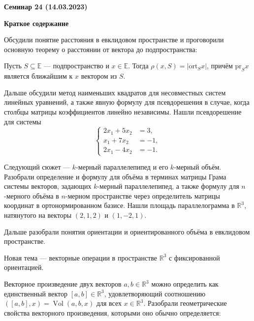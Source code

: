 \documentclass[10pt, a4paper]{extarticle}
\def \R{\mathbb{R}}
\newcommand{\Vol}{\mathop{\mathrm{Vol}}}
\theoremstyle{definition}
\begin{document}
\begin{center}
\small
\noindent{}
\end{center}

\large

\begin{center}
\textbf{Семинар 24 (14.03.2023)}
\end{center}

\textbf{Краткое содержание}

Обсудили понятие расстояния в евклидовом пространстве и проговорили основную теорему о расстоянии от вектора до подпространства:

Пусть $S \subseteq \mathbb E$ --- подпространство и $x \in \mathbb E$.
Тогда $\rho(x,S) = | \mathrm{ort}_S x |$, причём $\mathrm{pr}_S x$ является ближайшим к $x$ вектором из $S$.


Дальше обсудили метод наименьших квадратов для несовместных систем линейных уравнений, а также явную формулу для псевдорешения в случае, когда столбцы матрицы коэффициентов линейно независимы.
Нашли псевдорешение для системы
\begin{equation} \label{eqn_SLE}
\begin{cases}
2x_1 + 5x_2 &= 3,\\
x_1 + 7x_2 &= -1,\\
2x_1 - 4x_2 &= -1.
\end{cases}
\end{equation}

Следующий сюжет --- $k$-мерный параллелепипед и его $k$-мерный объём.
Разобрали определение и формулу для объёма в терминах матрицы Грама системы векторов, задающих $k$-мерный параллелепипед, а также формулу для $n$-мерного объёма в $n$-мерном пространстве через определитель матрицы координат в ортонормированном базисе.
Нашли площадь параллелограмма в $\R^3$, натянутого на векторы $(2,1,2)$ и $(1,-2,1)$.

Дальше разобрали понятия ориентации и ориентированного объёма в евклидовом пространстве.

Новая тема --- векторные операции в пространстве $\R^3$ с фиксированной ориентацией.

Векторное произведение двух векторов $a,b \in \R^3$ можно определить как единственный вектор $[a,b] \in \R^3$, удовлетворяющий соотношению $([a,b],x) = \Vol(a,b,x)$ для всех $x \in \R^3$.
Разобрали геометрические свойства векторного произведения, которыми оно обычно определяется:
\end{document}
